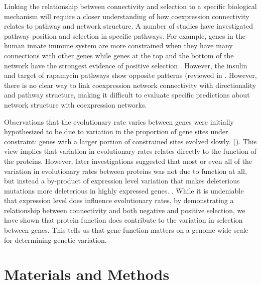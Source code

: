 Linking the relationship between connectivity and selection to a specific biological mechanism will require a closer understanding of how coexpression connectivity relates to pathway and network structure. A number of studies have investigated pathway position and selection in specific pathways. For example, genes in the human innate immune system are more constrained when they have many connections with other genes while genes at the top and the bottom of the network have the strongest evidence of positive selection \citep{Casals2011-jz}. However, the insulin and target of rapamycin pathways show opposite patterns (reviewed in \citep{Olson-Manning2013-op}. However, there is no clear way to link coexpression network connectivity with directionality and pathway structure, making it difficult to evaluate specific predictions about network structure with coexpression networks.

Observations that the evolutionary rate varies between genes were initially hypothesized to be due to variation in the proportion of gene sites under constraint: genes with a larger portion of constrained sites evolved slowly. (\citep{Kimura1977-ib}). This view implies that variation in evolutionary rates relates directly to the function of the proteins. However, later investigations suggested that most or even all of the variation in evolutionary rates between proteins was not due to function at all, but instead a by-product of expression level variation that makes deleterious mutations more deleterious in highly expressed genes. \citep{Drummond2006-pa,Zhang2015-ne}. While it is undeniable that expression level does influence evolutionary rates, by demonstrating a relationship between connectivity and both negative and positive selection, we have shown that protein function does contribute to the variation in selection between genes. This tells us that gene function matters on a genome-wide scale for determining genetic variation. 


\section{Materials and Methods}

